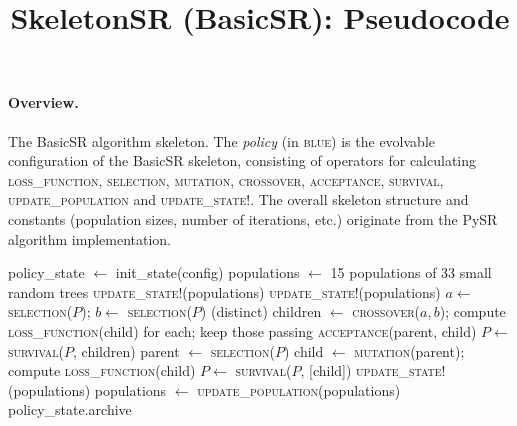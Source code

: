 \documentclass[11pt]{article}
\title{SkeletonSR (BasicSR): Pseudocode}
\author{}
\date{}
\newcommand{\slot}[1]{\textcolor{blue!70!black}{\textsc{#1}}}
\begin{document}
\maketitle

\paragraph{Overview.}
The BasicSR algorithm skeleton. The \emph{policy} (in \textcolor{blue!70!black}{\textsc{blue}}) is the evolvable configuration of the BasicSR skeleton, consisting of
operators for calculating \slot{loss\_function}, \slot{selection}, \slot{mutation}, \slot{crossover},
\slot{acceptance}, \slot{survival}, \slot{update\_population} and \slot{update\_state!}. The overall skeleton structure and constants (population sizes, number of iterations, etc.) originate from the PySR algorithm implementation.

\begin{algorithmic}[1]
  \State policy\_state $\gets$ init\_state(config)
  \State populations $\gets$ 15 populations of 33 small random trees
  \State \slot{update\_state!}(populations)
        \State \slot{update\_state!}(populations)
            \State $a \gets$ \slot{selection}($P$); \; $b \gets$ \slot{selection}($P$) \quad (distinct)
            \State children $\gets$ \slot{crossover}($a,b$); \; compute \slot{loss\_function}(child) for each; keep those passing \slot{acceptance}(parent, child)
             $P \gets$ \slot{survival}($P$, children) \EndIf
          \Else
            \State parent $\gets$ \slot{selection}($P$)
            \State child $\gets$ \slot{mutation}(parent); \; compute \slot{loss\_function}(child)
            \If{\slot{acceptance}(parent, child)} $P \gets$ \slot{survival}($P$, [child]) \EndIf
          \EndIf
        \EndFor
      \EndFor
      \State \slot{update\_state!}(populations)
      \State populations $\gets$ \slot{update\_population}(populations)
    \EndFor
  \EndFor
  \State \Return policy\_state.archive
\EndFunction
\end{algorithmic}
\end{document}
